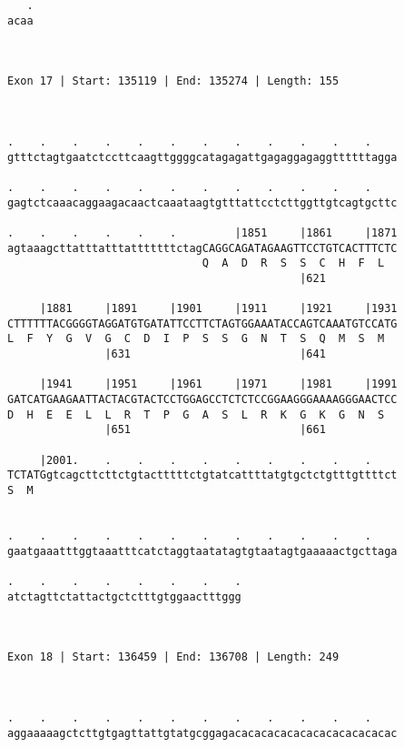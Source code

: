 \documentclass{article}
\begin{document}
\begin{Verbatim}
   .
acaa
    
    
 
Exon 17 | Start: 135119 | End: 135274 | Length: 155



.    .    .    .    .    .    .    .    .    .    .    .    
gtttctagtgaatctccttcaagttggggcatagagattgagaggagaggttttttagga
                                                            
.    .    .    .    .    .    .    .    .    .    .    .    
gagtctcaaacaggaagacaactcaaataagtgtttattcctcttggttgtcagtgcttc
                                                            
.    .    .    .    .    .         |1851     |1861     |1871
agtaaagcttatttatttatttttttctagCAGGCAGATAGAAGTTCCTGTCACTTTCTC
                              Q  A  D  R  S  S  C  H  F  L  
                                             |621           
  
     |1881     |1891     |1901     |1911     |1921     |1931
CTTTTTTACGGGGTAGGATGTGATATTCCTTCTAGTGGAAATACCAGTCAAATGTCCATG
L  F  Y  G  V  G  C  D  I  P  S  S  G  N  T  S  Q  M  S  M  
               |631                          |641           
  
     |1941     |1951     |1961     |1971     |1981     |1991
GATCATGAAGAATTACTACGTACTCCTGGAGCCTCTCTCCGGAAGGGAAAAGGGAACTCC
D  H  E  E  L  L  R  T  P  G  A  S  L  R  K  G  K  G  N  S  
               |651                          |661           
  
     |2001.    .    .    .    .    .    .    .    .    .    
TCTATGgtcagcttcttctgtactttttctgtatcattttatgtgctctgtttgttttct
S  M                                                        
                                                            
  
.    .    .    .    .    .    .    .    .    .    .    .    
gaatgaaatttggtaaatttcatctaggtaatatagtgtaatagtgaaaaactgcttaga
                                                            
.    .    .    .    .    .    .    .
atctagttctattactgctctttgtggaactttggg
                                    
                                    
 
Exon 18 | Start: 136459 | End: 136708 | Length: 249



.    .    .    .    .    .    .    .    .    .    .    .    
aggaaaaagctcttgtgagttattgtatgcggagacacacacacacacacacacacacac
                                                            

\end{Verbatim}
\end{document}
